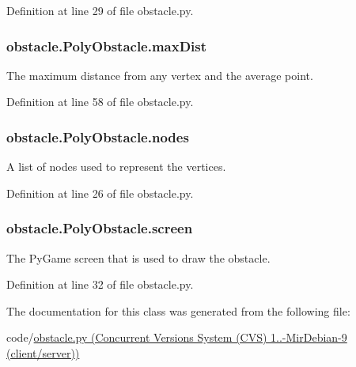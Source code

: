 Definition at line 29 of file obstacle.\-py.

\hypertarget{classobstacle_1_1PolyObstacle_a14e97b3f09f9ff21f36efc7a58759e5c}{
\subsubsection[{max\-Dist}]{\setlength{\rightskip}{0pt plus 5cm}obstacle.\-Poly\-Obstacle.\-max\-Dist}}\label{classobstacle_1_1PolyObstacle_a14e97b3f09f9ff21f36efc7a58759e5c}


The maximum distance from any vertex and the average point. 



Definition at line 58 of file obstacle.\-py.

\hypertarget{classobstacle_1_1PolyObstacle_a125762f0b4a3c9ef8d75c81bc5bc608e}{
\subsubsection[{nodes}]{\setlength{\rightskip}{0pt plus 5cm}obstacle.\-Poly\-Obstacle.\-nodes}}\label{classobstacle_1_1PolyObstacle_a125762f0b4a3c9ef8d75c81bc5bc608e}


A list of nodes used to represent the vertices. 



Definition at line 26 of file obstacle.\-py.

\hypertarget{classobstacle_1_1PolyObstacle_ad65d210c167b0638ef317ef24670501c}{
\subsubsection[{screen}]{\setlength{\rightskip}{0pt plus 5cm}obstacle.\-Poly\-Obstacle.\-screen}}\label{classobstacle_1_1PolyObstacle_ad65d210c167b0638ef317ef24670501c}


The Py\-Game screen that is used to draw the obstacle. 



Definition at line 32 of file obstacle.\-py.



The documentation for this class was generated from the following file\-:\begin{DoxyCompactItemize}
\item 
code/\hyperlink{obstacle_8py}{obstacle.\-py (\-Concurrent Versions System (\-C\-V\-S) 1..-\/\-Mir\-Debian-\/9 (client/server))}\end{DoxyCompactItemize}
